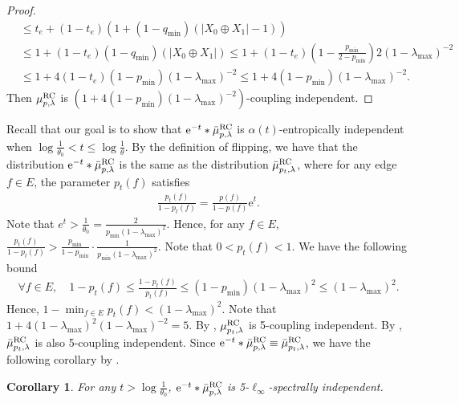 \documentclass[11pt,a4paper]{article}
\newcommand{\e}{\mathrm{e}}
\newtheorem{corollary}[theorem]{Corollary}
\theoremstyle{definition}
\begin{document}
\begin{proof}
\begin{align*}
        &\leq t_e + (1-t_e)(1+(1-q_{\min})(|X_0 \oplus X_1|-1))\\
        &\leq1 + (1-t_e)(1-q_{\min})(|X_0 \oplus X_1|)\leq 1 + (1-t_e)(1-\frac{p_{\min}}{2-p_{\min}})2(1-\lambda_{\max})^{-2}\\
        &\leq 1+4(1-t_e)(1-p_{\min})(1-\lambda_{\max})^{-2}\leq 1 +4(1-p_{\min})(1-\lambda_{\max})^{-2}.
     \end{align*}
     Then $\mu_{p,\lambda}^{\textnormal{RC}}$ is $(1 +4(1-p_{\min})(1-\lambda_{\max})^{-2})$-coupling independent.
    \end{proof}   
    


Recall that our goal is to show that $\e^{-t}*\bar{\mu}_{p,\lambda}^{\textnormal{RC}}$ is $\alpha(t)$-entropically independent when $\log\frac{1}{\theta_0} < t \leq \log \frac{1}{\theta}$. By the definition of flipping, we have that the distribution $\e^{-t}*\bar{\mu}_{p,\lambda}^{\textnormal{RC}}$ is the same as the distribution $\bar{\mu}_{p_t,\lambda}^{\textnormal{RC}}$, where for any edge $f \in E$, the parameter $p_t(f)$ satisfies
\begin{align}\label{eq:para-pt}
    \frac{p_t(f)}{1-p_t(f)} = \frac{p(f)}{1-p(f)} \e^t.
\end{align}
Note that $e^t > \frac{1}{\theta_0} = \frac{2}{p_{\min}(1-\lambda_{\max})^2}$. Hence, for any $f \in E$, $\frac{p_t(f)}{1 - p_t(f)} > \frac{p_{\min}}{1-p_{\min}} \cdot \frac{1}{p_{\min}(1-\lambda_{\max})^2}$. Note that $0 < p_t(f) < 1$. We have the following bound 
\begin{align*}
\forall f \in E,\quad  1 - p_t(f) \leq \frac{1-p_t(f)}{p_t(f)} \leq (1 - p_{\min})(1-\lambda_{\max})^2 \leq (1-\lambda_{\max})^2.
\end{align*}
Hence, $1 - \min_{f \in E}p_t(f) < (1-\lambda_{\max})^2$.
Note that $1 + 4(1-\lambda_{\max})^2(1-\lambda_{\max})^{-2} = 5$.
By , $\mu_{p_t,\lambda}^{\textnormal{RC}}$ is 5-coupling independent. 
By , $\bar{\mu}_{p_t,\lambda}^{\textnormal{RC}}$ is also 5-coupling independent. Since $\e^{-t}*\bar{\mu}_{p,\lambda}^{\textnormal{RC}} \equiv \bar{\mu}_{p_t,\lambda}^{\textnormal{RC}}$, we have the following corollary by .
\begin{corollary}\label{cor:EI-rc-large-lambda}
For any $t > \log\frac{1}{\theta_0}$, $\e^{-t}*\bar{\mu}_{p,\lambda}^{\textnormal{RC}}$ is 5-$\ell_\infty$-spectrally independent.
\end{corollary}
\end{document}

